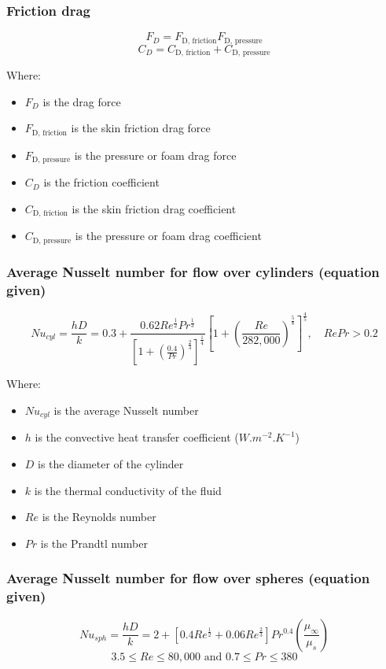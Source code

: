 \documentclass[11pt]{article}
\begin{document}
\subsubsection{Friction drag}
\label{sec:org26b097f}
\[F_D = F_{\text{D, friction}} F_{\text{D, pressure}}\]
\[C_D = C_{\text{D, friction}} + C_{\text{D, pressure}}\]

Where:
\begin{itemize}
\item \(F_D\) is the drag force
\item \(F_{\text{D, friction}}\) is the skin friction drag force
\item \(F_{\text{D, pressure}}\) is the pressure or foam drag force
\item \(C_D\) is the friction coefficient
\item \(C_{\text{D, friction}}\) is the skin friction drag coefficient
\item \(C_{\text{D, pressure}}\) is the pressure or foam drag coefficient
\end{itemize}

\subsubsection{Average Nusselt number for flow over cylinders (equation given)}
\label{sec:org981db0c}
\[Nu_{cyl} = \frac{hD}{k} = 0.3 + \frac{0.62 Re^{\frac{1}{2}} Pr^{\frac{1}{3}}}{\left[1 + \left(\frac{0.4}{Pr} \right)^{\frac{2}{3}} \right]^{\frac{1}{4}}} \left[1 + \left(\frac{Re}{282,000} \right)^{\frac{5}{8}} \right]^{\frac{4}{5}}, \quad RePr > 0.2\]

Where:
\begin{itemize}
\item \(Nu_{cyl}\) is the average Nusselt number
\item \(h\) is the convective heat transfer coefficient (\(\unit{W.m^{-2}.K^{-1}}\))
\item \(D\) is the diameter of the cylinder
\item \(k\) is the thermal conductivity of the fluid
\item \(Re\) is the Reynolds number
\item \(Pr\) is the Prandtl number
\end{itemize}

\subsubsection{Average Nusselt number for flow over spheres (equation given)}
\label{sec:org7f78568}
\[Nu_{sph} = \frac{hD}{k} = 2 + \left[0.4 Re^{\frac{1}{2}} + 0.06 Re^{\frac{2}{3}} \right] Pr^{0.4} \left(\frac{\mu_{\infty}}{\mu_s} \right)\]
\[3.5 \le Re \le 80,000 \text{ and } 0.7 \le Pr \le 380\]
\end{document}
